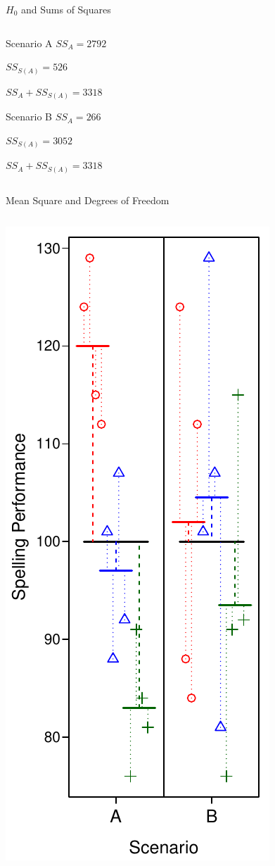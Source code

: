 \documentclass[presentation]{beamer}
\begin{document}
\begin{frame}[label={sec:org78258d4}]{\(H_0\) and Sums of Squares}
\begin{columns}
\begin{column}{.73\columnwidth}
\begin{block}{Scenario A}
\(SS_{A} = 2792\)

\(SS_{S(A)}=526\)

\(SS_{A} + SS_{S(A)}=3318\)
\end{block}

\begin{block}{Scenario B}
\(SS_{A} = 266\)

\(SS_{S(A)}=3052\)

\(SS_{A} + SS_{S(A)}=3318\)
\end{block}
\end{column}
\end{columns}
\end{frame}

\begin{frame}[label={sec:org99e0600}]{Mean Square and Degrees of Freedom}
\begin{columns}
\begin{column}{.27\columnwidth}
\includegraphics[scale=.5]{08_glm_img/spelling-05.pdf}

\end{column}
\end{columns}
\end{frame}
\end{document}
